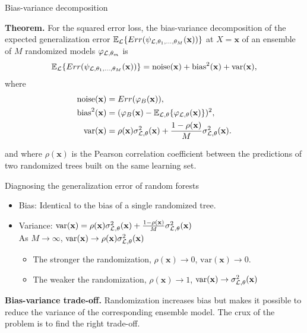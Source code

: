 \documentclass{beamer}
\begin{document}
\begin{frame}{Bias-variance decomposition}

{\bf Theorem.}
For the squared error loss, the bias-variance decomposition of the expected
generalization error $\mathbb{E}_{\cal L} \{ Err( \psi_{{\cal L},\theta_1,\dots,\theta_M}(\mathbf{x}))
\}$ at $X=\mathbf{x}$ of an ensemble of $M$ randomized models $\varphi_{{\cal L},\theta_m}$ is
\begin{equation*}
\mathbb{E}_{\cal L} \{ Err(\psi_{{\cal L},\theta_1,\dots,\theta_M}(\mathbf{x})) \} = \text{noise}(\mathbf{x}) + \text{bias}^2(\mathbf{x}) + \text{var}(\mathbf{x}),
\end{equation*}
where
\begin{align*}
\text{noise}(\mathbf{x}) &= Err(\varphi_B(\mathbf{x})), \\
\text{bias}^2(\mathbf{x}) &= (\varphi_B(\mathbf{x}) - \mathbb{E}_{{\cal L},\theta} \{ \varphi_{{\cal L},\theta}(\mathbf{x}) \} )^2, \\
\text{var}(\mathbf{x}) &= \rho(\mathbf{x}) \sigma^2_{{\cal L},\theta}(\mathbf{x}) + \frac{1 - \rho(\mathbf{x})}{M} \sigma^2_{{\cal L},\theta}(\mathbf{x}).
\end{align*}

and where $\rho(\mathbf{x})$ is the Pearson correlation coefficient between
the predictions of two randomized trees built on the same learning set.

\end{frame}


\begin{frame}{Diagnosing the generalization error of random forests}

\begin{itemize}
\item Bias: {\color{blue} Identical} to the bias of a single randomized tree.
\item Variance: $\text{var}(\mathbf{x}) = \rho(\mathbf{x}) \sigma^2_{{\cal L},\theta}(\mathbf{x}) + \frac{1 - \rho(\mathbf{x})}{M} \sigma^2_{{\cal L},\theta}(\mathbf{x})$\\
As $M \to \infty$, {\color{red} $\text{var}(\mathbf{x}) \to \rho(\mathbf{x}) \sigma^2_{{\cal L},\theta}(\mathbf{x})$}
  \begin{itemize}
    \item The stronger the randomization, $\rho(\mathbf{x}) \to 0$, $\text{var}(\mathbf{x}) \to 0$.
    \item The weaker the randomization, $\rho(\mathbf{x}) \to 1$, $\text{var}(\mathbf{x}) \to \sigma^2_{{\cal L},\theta}(\mathbf{x})$
  \end{itemize}
\end{itemize}

\vspace{1cm}

{\bf Bias-variance trade-off.} Randomization increases bias but makes it
possible to reduce the variance of the corresponding ensemble model. The crux
of the problem is to {\color{red} find the right trade-off}.

\end{frame}
\end{document}
